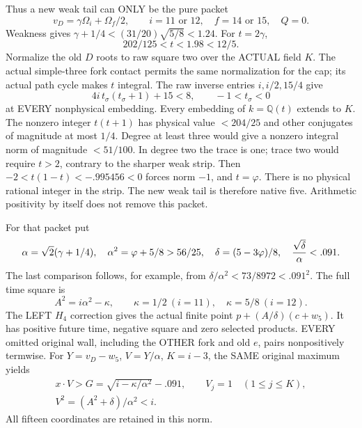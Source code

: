 \documentclass[11pt]{article}
\begin{document}
Thus a new weak tail can ONLY be the pure packet
\[
 v_D=\gamma\Omega_i+\Omega_f/2,\qquad
 i=11\text{ or }12,\quad f=14\text{ or }15,\quad Q=0 .
\]
Weakness gives
\(\gamma+1/4<(31/20)\sqrt{5/8}<1.24\).
For \(t=2\gamma\),
\[
                    202/125<t<1.98<12/5 .
\]
Normalize the old \(D\) roots to raw square two over
the ACTUAL field \(K\).
The actual simple-three fork contact permits the same
normalization for the cap; its actual path cycle makes
\(t\) integral.
The raw inverse entries \(i,i/2,15/4\) give
\[
             4i\,t_\sigma(t_\sigma+1)+15<8,
             \qquad -1<t_\sigma<0
\]
at EVERY nonphysical embedding.
Every embedding of \(k=\mathbb Q(t)\) extends to \(K\).
The nonzero integer \(t(t+1)\) has physical value
\(<204/25\) and other conjugates of magnitude at most \(1/4\).
Degree at least three would give a nonzero integral norm
of magnitude \(<51/100\).
In degree two the trace is one; trace two would require
\(t>2\), contrary to the sharper weak strip.
Then \(-2<t(1-t)<-.995456<0\) forces norm \(-1\),
and \(t=\varphi\).
There is no physical rational integer in the strip.
The new weak tail is therefore native five.
Arithmetic positivity by itself does not remove this packet.

For that packet put
\[
 \alpha=\sqrt2(\gamma+1/4),\quad
 \alpha^2=\varphi+5/8>56/25,\quad
 \delta=(5-3\varphi)/8,\quad
 {\sqrt\delta\over\alpha}<.091 .
\]
The last comparison follows, for example, from
\(\delta/\alpha^2<73/8972<.091^2\).
The full time square is
\[
 A^2=i\alpha^2-\kappa,\qquad
 \kappa=1/2\ (i=11),\quad \kappa=5/8\ (i=12).
\]
The LEFT \(H_4\) correction gives the actual finite point
\(p+(A/\delta)(c+w_5)\).
It has positive future time, negative square and zero
selected products.
EVERY omitted original wall, including the OTHER fork
and old \(e\), pairs nonpositively termwise.
For \(Y=v_D-w_5\), \(V=Y/\alpha\), \(K=i-3\),
the SAME original maximum yields
\[
 \begin{gathered}
 x\cdot V>G=\sqrt{i-\kappa/\alpha^2}-.091,\qquad
 V_j=1\quad(1\le j\le K),\\
 V^2=(A^2+\delta)/\alpha^2<i .
 \end{gathered}
\]
All fifteen coordinates are retained in this norm.
\end{document}
